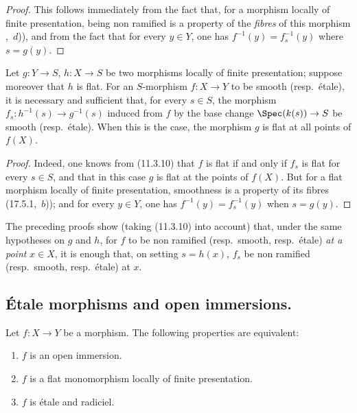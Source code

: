 \begin{proof}
This follows immediately from the fact that, for a morphism locally of finite presentation, being non ramified is a property of the \emph{fibres} of this morphism ,~$d$)), and from the fact that for every $y\in Y$, one has $f^{-1}(y)=f_s^{-1}(y)$ where $s=g(y)$.
\end{proof}

\begin{proposition}[17.8.2]
\label{IV.17.8.2}
Let $g:Y\to S$, $h:X\to S$ be two morphisms locally of finite presentation; suppose moreover that $h$ is flat.
For an $S$-morphism $f:X\to Y$ to be smooth (resp.\ \'etale), it is necessary and sufficient that, for every $s\in S$, the morphism $f_s:h^{-1}(s)\to g^{-1}(s)$ induced from $f$ by the base change $\Spec(k(s))\to S$ be smooth (resp.\ \'etale).
When this is the case, the morphism $g$ is flat at all points of $f(X)$.
\end{proposition}

\begin{proof}
Indeed, one knows from (11.3.10) that $f$ is flat if and only if $f_s$ is flat for every $s\in S$, and that in this case $g$ is flat at the points of $f(X)$.
But for a flat morphism locally of finite presentation, smoothness is a property of its fibres (17.5.1,~$b$)); and for every $y\in Y$, one has $f^{-1}(y)=f_s^{-1}(y)$ when $s=g(y)$.
\end{proof}

\begin{remark}[17.8.3]
\label{IV.17.8.3}
The preceding proofs show (taking (11.3.10) into account) that, under the same hypotheses on $g$ and $h$, for $f$ to be non ramified (resp.\ smooth, resp.\ \'etale) \emph{at a point} $x\in X$, it is enough that, on setting $s=h(x)$, $f_s$ be non ramified (resp.\ smooth, resp.\ \'etale) at $x$.
\end{remark}


\subsection{\'Etale morphisms and open immersions.}
\label{subsection:IV.17.9}

\begin{theorem}[17.9.1]
\label{IV.17.9.1}
Let $f:X\to Y$ be a morphism.
The following properties are equivalent:
\begin{enumerate}
  \item[a)] $f$ is an open immersion.
  \item[b)] $f$ is a flat monomorphism locally of finite presentation.
  \item[c)] $f$ is \'etale and radiciel.
\end{enumerate}
\end{theorem}

